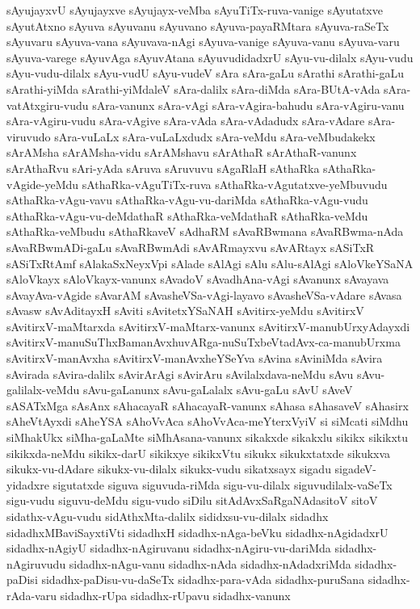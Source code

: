 {sAyujayxvU
sAyujayxve
sAyujayx-veMba
sAyuTiTx-ruva-vanige
sAyutatxve
sAyutAtxno
sAyuva
sAyuvanu
sAyuvano
sAyuva-payaRMtara
sAyuva-raSeTx
sAyuvaru
sAyuva-vana
sAyuvava-nAgi
sAyuva-vanige
sAyuva-vanu
sAyuva-varu
sAyuva-varege
sAyuvAga
sAyuvAtana
sAyuvudidadxrU
sAyu-vu-dilalx
sAyu-vudu
sAyu-vudu-dilalx
sAyu-vudU
sAyu-vudeV
sAra
sAra-gaLu
sArathi
sArathi-gaLu
sArathi-yiMda
sArathi-yiMdaleV
sAra-dalilx
sAra-diMda
sAra-BUtA-vAda
sAra-vatAtxgiru-vudu
sAra-vanunx
sAra-vAgi
sAra-vAgira-bahudu
sAra-vAgiru-vanu
sAra-vAgiru-vudu
sAra-vAgive
sAra-vAda
sAra-vAdadudx
sAra-vAdare
sAra-viruvudo
sAra-vuLaLx
sAra-vuLaLxdudx
sAra-veMdu
sAra-veMbudakekx
sArAMsha
sArAMsha-vidu
sArAMshavu
sArAthaR
sArAthaR-vanunx
sArAthaRvu
sAri-yAda
sAruva
sAruvuvu
sAgaRlaH
sAthaRka
sAthaRka-vAgide-yeMdu
sAthaRka-vAguTiTx-ruva
sAthaRka-vAgutatxve-yeMbuvudu
sAthaRka-vAgu-vavu
sAthaRka-vAgu-vu-dariMda
sAthaRka-vAgu-vudu
sAthaRka-vAgu-vu-deMdathaR
sAthaRka-veMdathaR
sAthaRka-veMdu
sAthaRka-veMbudu
sAthaRkaveV
sAdhaRM
sAvaRBwmana
sAvaRBwma-nAda
sAvaRBwmADi-gaLu
sAvaRBwmAdi
sAvARmayxvu
sAvARtayx
sASiTxR
sASiTxRtAmf
sAlakaSxNeyxVpi
sAlade
sAlAgi
sAlu
sAlu-sAlAgi
sAloVkeYSaNA
sAloVkayx
sAloVkayx-vanunx
sAvadoV
sAvadhAna-vAgi
sAvanunx
sAvayava
sAvayAva-vAgide
sAvarAM
sAvasheVSa-vAgi-layavo
sAvasheVSa-vAdare
sAvasa
sAvasw
sAvAditayxH
sAviti
sAvitetxYSaNAH
sAvitirx-yeMdu
sAvitirxV
sAvitirxV-maMtarxda
sAvitirxV-maMtarx-vanunx
sAvitirxV-manubUrxyAdayxdi
sAvitirxV-manuSuThxBamanAvxhuvARga-nuSuTxbeVtadAvx-ca-manubUrxma
sAvitirxV-manAvxha
sAvitirxV-manAvxheYSeYva
sAvina
sAviniMda
sAvira
sAvirada
sAvira-dalilx
sAvirArAgi
sAvirAru
sAvilalxdava-neMdu
sAvu
sAvu-galilalx-veMdu
sAvu-gaLanunx
sAvu-gaLalalx
sAvu-gaLu
sAvU
sAveV
sASATxMga
sAsAnx
sAhacayaR
sAhacayaR-vanunx
sAhasa
sAhasaveV
sAhasirx
sAheVtAyxdi
sAheYSA
sAhoVvAca
sAhoVvAca-meYterxVyiV
si
siMcati
siMdhu
siMhakUkx
siMha-gaLaMte
siMhAsana-vanunx
sikakxde
sikakxlu
sikikx
sikikxtu
sikikxda-neMdu
sikikx-darU
sikikxye
sikikxVtu
sikukx
sikukxtatxde
sikukxva
sikukx-vu-dAdare
sikukx-vu-dilalx
sikukx-vudu
sikatxsayx
sigadu
sigadeV-yidadxre
sigutatxde
siguva
siguvuda-riMda
sigu-vu-dilalx
siguvudilalx-vaSeTx
sigu-vudu
siguvu-deMdu
sigu-vudo
siDilu
sitAdAvxSaRgaNAdasitoV
sitoV
sidathx-vAgu-vudu
sidAthxMta-dalilx
sididxsu-vu-dilalx
sidadhx
sidadhxMBaviSayxtiVti
sidadhxH
sidadhx-nAga-beVku
sidadhx-nAgidadxrU
sidadhx-nAgiyU
sidadhx-nAgiruvanu
sidadhx-nAgiru-vu-dariMda
sidadhx-nAgiruvudu
sidadhx-nAgu-vanu
sidadhx-nAda
sidadhx-nAdadxriMda
sidadhx-paDisi
sidadhx-paDisu-vu-daSeTx
sidadhx-para-vAda
sidadhx-puruSana
sidadhx-rAda-varu
sidadhx-rUpa
sidadhx-rUpavu
sidadhx-vanunx
}
